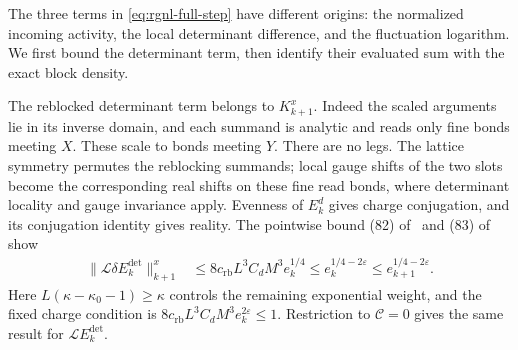 \documentclass[11pt,letterpaper,reqno]{amsart}
\newcommand{\exteq}[2]{(#1) of~\cite{#2}}
\begin{document}
The three terms in \eqref{eq:rgnl-full-step} have different origins:
the normalized incoming activity, the local determinant difference,
and the fluctuation logarithm. We first bound the determinant term,
then identify their evaluated sum with the exact block density.

The reblocked determinant term belongs to $K_{k+1}^x$.
Indeed the scaled arguments lie in its inverse domain,
and each summand is analytic and reads only fine
bonds meeting $X$. These scale to bonds meeting $Y$.
There are no legs. The lattice symmetry permutes the
reblocking summands; local gauge shifts of the two
slots become the corresponding real shifts on these
fine read bonds, where determinant locality and gauge
invariance apply. Evenness of $E_k^d$ gives charge
conjugation, and its conjugation identity gives reality.
The pointwise bound
\exteq{82}{FermionBlockManuscript} and
\exteq{83}{NormalizedContraction} show
\begin{align}
 \|\mathcal L\delta E_k^{\mathrm{det}}\|_{k+1}^x
    &\le8c_{\mathrm{rb}}L^3C_dM^3e_k^{1/4}
      \le e_k^{1/4-2\varepsilon}
      \le e_{k+1}^{1/4-2\varepsilon}.
                                      \label{eq:rgnl-reblocked-determinant}
\end{align}
Here $L(\kappa-\kappa_0-1)\ge\kappa$ controls the
remaining exponential weight, and the fixed charge
condition is
$8c_{\mathrm{rb}}L^3C_dM^3e_k^{2\varepsilon}\le1$.
Restriction to $\mathscr C=0$ gives the same result
for $\mathcal LE_k^{\mathrm{det}}$.
\end{document}
